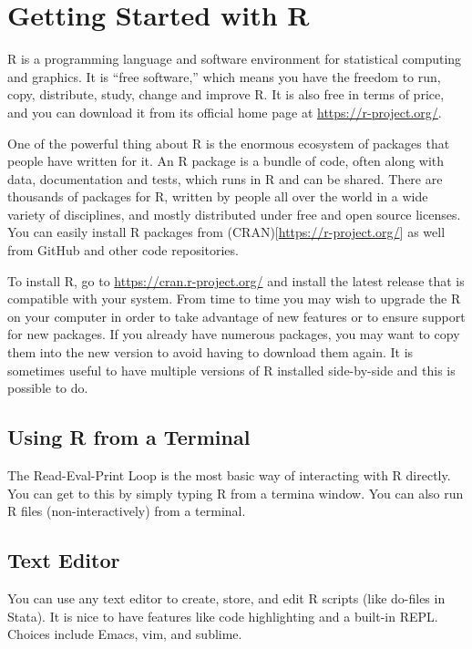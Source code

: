 \documentclass[]{book}
\begin{document}
\hypertarget{getting-started-with-r}{%
\chapter{Getting Started with R}\label{getting-started-with-r}}

R is a programming language and software environment for statistical computing and graphics. It is ``free software,'' which means you have the freedom to run, copy, distribute, study, change and improve R. It is also free in terms of price, and you can download it from its official home page at \url{https://r-project.org/}.

One of the powerful thing about R is the enormous ecosystem of packages that people have written for it. An R package is a bundle of code, often along with data, documentation and tests, which runs in R and can be shared. There are thousands of packages for R, written by people all over the world in a wide variety of disciplines, and mostly distributed under free and open source licenses. You can easily install R packages from (CRAN){[}\url{https://r-project.org/}{]} as well from GitHub and other code repositories.

To install R, go to \url{https://cran.r-project.org/} and install the latest release that is compatible with your system. From time to time you may wish to upgrade the R on your computer in order to take advantage of new features or to ensure support for new packages. If you already have numerous packages, you may want to copy them into the new version to avoid having to download them again. It is sometimes useful to have multiple versions of R installed side-by-side and this is possible to do.

\hypertarget{using-r-from-a-terminal}{%
\section{Using R from a Terminal}\label{using-r-from-a-terminal}}

The Read-Eval-Print Loop is the most basic way of interacting with R directly. You can get to this by simply typing R from a termina window. You can also run R files (non-interactively) from a terminal.

\hypertarget{text-editor}{%
\section{Text Editor}\label{text-editor}}

You can use any text editor to create, store, and edit R scripts (like do-files in Stata). It is nice to have features like code highlighting and a built-in REPL. Choices include Emacs, vim, and sublime.
\end{document}
